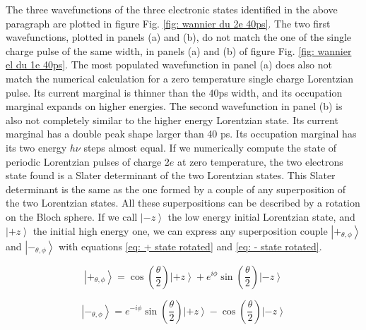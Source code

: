 The three wavefunctions of the three electronic states identified in the above paragraph are plotted in figure Fig. \ref{fig: wannier du 2e 40ps}.
The two first wavefunctions, plotted in panels (a) and (b), do not match the one of the single charge pulse of the same width, in panels (a) and (b) of figure Fig. \ref{fig: wannier el du 1e 40ps}.
The most populated wavefunction in panel (a) does also not match the numerical calculation for a zero temperature single charge Lorentzian pulse.
Its current marginal is thinner than the 40ps width, and its occupation marginal expands on higher energies.
The second wavefunction in panel (b) is also not completely similar to the higher energy Lorentzian state.
Its current marginal has a double peak shape larger than 40 ps.
Its occupation marginal has its two energy $h\nu$ steps almost equal.
If we numerically compute the state of periodic Lorentzian pulses of charge $2e$ at zero temperature, the two electrons state found is a Slater determinant of the two Lorentzian states.
This Slater determinant is the same as the one formed by a couple of any superposition of the two Lorentzian states.
All these superpositions can be described by a rotation on the Bloch sphere.
If we call $\left|-z\right>$ the low energy initial Lorentzian state, and $\left|+z\right>$ the initial high energy one, we can express any superposition couple $\left|+_{\theta,\phi}\right>$ and $\left|-_{\theta,\phi}\right>$ with equations \eqref{eq: + state rotated} and \eqref{eq: - state rotated}.

\begin{equation}
\left|+_{\theta,\phi}\right> = \cos\left(\frac{\theta}{2}\right)\left|+z\right>+e^{i\phi}\sin\left(\frac{\theta}{2}\right)\left|-z\right> \label{eq: + state rotated}
\end{equation}

\begin{equation}
\left|-_{\theta,\phi}\right> = e^{-i\phi}\sin\left(\frac{\theta}{2}\right)\left|+z\right>-\cos\left(\frac{\theta}{2}\right)\left|-z\right> \label{eq: - state rotated}
\end{equation}

